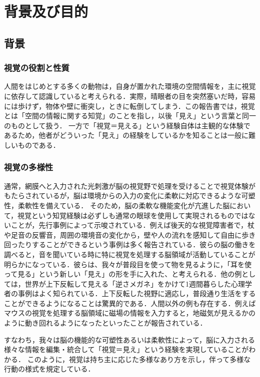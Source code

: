 \section{背景及び目的}
\subsection{背景}
\subsubsection{視覚の役割と性質}
人間をはじめとする多くの動物は，自身が置かれた環境の空間情報を，主に視覚に依存して認識していると考えられる．実際，晴眼者の目を突然塞いだ時，容易には歩けず，物体や壁に衝突し，ときに転倒してしまう．この報告書では，視覚とは「空間の情報に関する知覚」のことを指し，以後「見え」という言葉と同一のものとして扱う．
一方で「視覚＝見える」という経験自体は主観的な体験であるため，他者がどういった「見え」の経験をしているかを知ることは一般に難しいものである．

\subsubsection{視覚の多様性}
通常，網膜へと入力された光刺激が脳の視覚野で処理を受けることで視覚体験がもたらされているが，脳は環境からの入力の変化に柔軟に対応できるような可塑性，柔軟性を備えている．
そのため，脳の柔軟な機能変化が亢進した脳において，視覚という知覚経験は必ずしも通常の眼球を使用して実現されるものではないことが，先行事例によって示唆されている．例えば後天的な視覚障害者で，杖や足音の反響音，周囲の環境音の変化から，壁や人の流れを感知して自由に歩き回ったりすることができるという事例は多く報告されている．彼らの脳の働きを調べると，音を聞いている時に特に視覚を処理する脳領域が活動していることが明らかになっている．彼らは、我々が普段目を使って物を見るように，「耳を使って見る」という新しい「見え」の形を手に入れた、と考えられる．他の例としては，世界が上下反転して見える「逆さメガネ」をかけて1週間暮らした心理学者の事例はよく知られている．上下反転した視野に適応し，普段通り生活をすることができるようになることは驚異的である．人間以外の例も存在する．例えばマウスの視覚を処理する脳領域に磁場の情報を入力すると，地磁気が見えるかのように動き回れるようになったといったことが報告されている．

すなわち，我々は脳の機能的な可塑性あるいは柔軟性によって，脳に入力される様々な情報を編集・統合して「視覚＝見え」という経験を実現していることがわかる．
このように，視覚は持ち主に応じた多様なあり方を示し，伴って多様な行動の様式を規定している．

